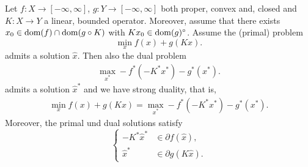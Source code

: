 \begin{theorem}\label{duality:eq:fenchel_duality}
    Let $f:X\rightarrow [-\infty,\infty]$, $g:Y\rightarrow[-\infty,\infty]$ both proper, convex and, closed and $K:X\rightarrow Y$ a linear, bounded operator. Moreover, assume that there exists $x_0 \in \operatorname{\mathrm{dom}}(f) \cap \operatorname{\mathrm{dom}}(g\circ K)$ with $K x_0 \in \operatorname{\mathrm{dom}}(g)^\circ$. Assume the (primal) problem 
    \begin{equation}
        \min_{x} f(x) + g(Kx).
    \end{equation}
    admits a solution $\hat x$. Then also the dual problem
    \begin{equation}
        \begin{aligned}
            \max_{x^*} -f^*(-K^*x^*) - g^*(x^*).
        \end{aligned}
    \end{equation}
    admits a solution $\hat x^*$ and we have strong duality, that is,
    \begin{equation}
        \begin{aligned}
            \min_{x} f(x) + g(Kx)
            = \max_{x^*} -f^*(-K^*x^*) - g^*(x^*).
        \end{aligned}
    \end{equation}
    Moreover, the primal und dual solutions satisfy
    \begin{equation}
        \begin{cases}
            -K^*\hat x^*&\in \partial f(\hat x),\\
            \hat x^* &\in \partial g(K\hat x).
        \end{cases}
    \end{equation}
\end{theorem}
